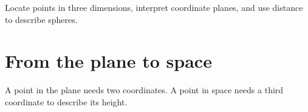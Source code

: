 \documentclass[11pt]{article}
\begin{document}

\begin{learninggoals}
Locate points in three dimensions, interpret coordinate planes, and use
distance to describe spheres.
\end{learninggoals}

\section{From the plane to space}
A point in the plane needs two coordinates. A point in space needs a third
coordinate to describe its height.
\end{document}

